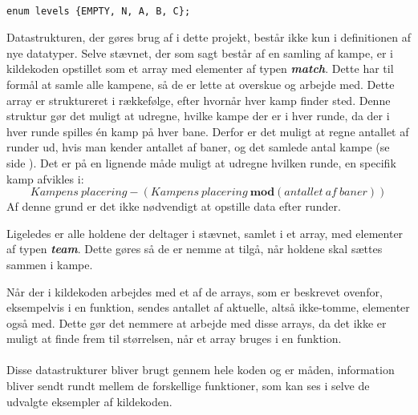 \begin{listing}[H]
\begin{verbatim}

enum levels {EMPTY, N, A, B, C};

\end{verbatim}
\label{code:levelEnum}
\end{listing}

Datastrukturen, der gøres brug af i dette projekt, består ikke kun i definitionen af nye datatyper. Selve stævnet, der som sagt består af en samling af kampe, er i kildekoden opstillet som et array med elementer af typen \textbf{\textit{match}}. Dette har til formål at samle alle kampene, så de er lette at overskue og arbejde med. Dette array er struktureret i rækkefølge, efter hvornår hver kamp finder sted. Denne struktur gør det muligt at udregne, hvilke kampe der er i hver runde, da der i hver runde spilles én kamp på hver bane. Derfor er det muligt at regne antallet af runder ud, hvis man kender antallet af baner, og det samlede antal kampe (se side \pageref{afsnit:createNewTournament}). Det er på en lignende måde muligt at udregne hvilken runde, en specifik kamp afvikles i: \[Kampens \ placering - (Kampens \ placering \ \textbf{mod} (antallet \ af \ baner))\]
Af denne grund er det ikke nødvendigt at opstille data efter runder.
\par
Ligeledes er alle holdene der deltager i stævnet, samlet i et array, med elementer af typen \textbf{\textit{team}}. Dette gøres så de er nemme at tilgå, når holdene skal sættes sammen i kampe.
\par
Når der i kildekoden arbejdes med et af de arrays, som er beskrevet ovenfor, eksempelvis i en funktion, sendes antallet af aktuelle, altså ikke-tomme, elementer også med. Dette gør det nemmere at arbejde med disse arrays, da det ikke er muligt at finde frem til størrelsen, når et array bruges i en funktion.
\\\\
Disse datastrukturer bliver brugt gennem hele koden og er måden, information bliver sendt rundt mellem de forskellige funktioner, som kan ses i selve de udvalgte eksempler af kildekoden.


